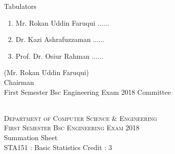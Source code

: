 \documentclass[12pt]{article}
\begin{document}
            \begin{table}[hb]
            	\centering
            \begin{minipage}[b]{0.5\linewidth} %
            {\centering Tabulators }
            \begin{enumerate}
                \item Mr. Rokan Uddin Faruqui \hspace*{1ex} $\ldots \ldots  $  
                \item Dr. Kazi Ashrafuzzaman \hspace*{1ex} $\ldots \ldots  $  
                \item Prof. Dr. Osiur Rahman \hspace*{1ex} $\ldots \ldots $  
            \end{enumerate} 

            \end{minipage}
            \hspace*{1.2cm}
            \begin{minipage}[b]{0.4\linewidth} \centering
            (Mr. Rokan Uddin Faruqui) \\
            Chairman  \hspace*{1ex} \\
           First Semester Bsc Engineering Exam 2018 Committee
            \end{minipage}
            \end{table}
            \clearpage
    \centering
    \begin{minipage}[m]{.8\textwidth} \centering 
	\smallskip
	\\
	\textsc{Department of Computer Science \& Engineering}\\
	\textsc{ First Semester Bsc Engineering Exam 2018}\\
    {\large {\sc Summation Sheet}}\\  
     {\centering STA151 : Basic Statistics     Credit : 3 } \\
    \end{minipage} 
\end{document}
